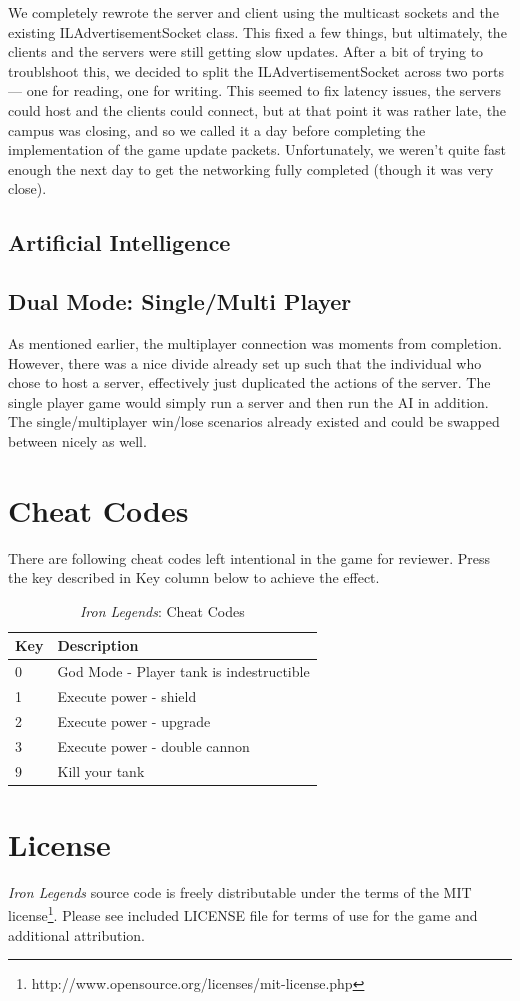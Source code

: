 \documentclass[letterpaper,11pt,twoside]{article}
\begin{document}
We completely rewrote the server and client using the multicast sockets and the existing ILAdvertisementSocket class. This fixed a few things, but ultimately, the clients and the servers were still getting slow updates. After a bit of trying to troublshoot this, we decided to split the ILAdvertisementSocket across two ports --- one for reading, one for writing. This seemed to fix latency issues, the servers could host and the clients could connect, but at that point it was rather late, the campus was closing, and so we called it a day before completing the implementation of the game update packets. Unfortunately, we weren't quite fast enough the next day to get the networking fully completed (though it was very close).

\subsection{Artificial Intelligence}

\subsection{Dual Mode: Single/Multi Player}

As mentioned earlier, the multiplayer connection was moments from completion. However, there was a nice divide already set up such that the individual who chose to host a server, effectively just duplicated the actions of the server. The single player game would simply run a server and then run the AI in addition. The single/multiplayer win/lose scenarios already existed and could be swapped between nicely as well.

\section{Cheat Codes}

There are following cheat codes left intentional in the game for reviewer.
Press the key described in Key column below to achieve the effect.

\begin{table}[htb]
	\centering
		\begin{tabular}{l|l}
		  \toprule
			Key & Description \\
			\midrule
            0 & God Mode - Player tank is indestructible \\
            1 & Execute power - shield \\
            2 & Execute power - upgrade \\
            3 & Execute power - double cannon \\
            9 & Kill your tank \\
			\bottomrule
		\end{tabular}
	\caption{\emph{Iron Legends}: Cheat Codes}
\end{table}


\section{License}
\emph{Iron Legends} source code is freely distributable under the terms of the MIT license\footnote{http://www.opensource.org/licenses/mit-license.php}.
Please see included LICENSE file for terms of use for the game and additional attribution.
\end{document}
